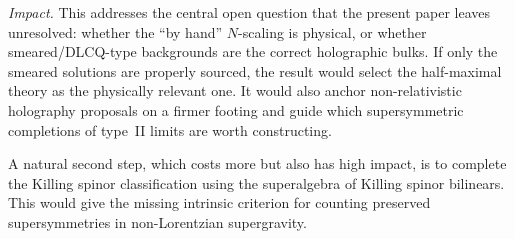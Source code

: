 \documentclass[11pt]{article}
\begin{document}
\emph{Impact.} This addresses the central open question that the present paper leaves unresolved: whether the ``by hand'' $N$-scaling is physical, or whether smeared/DLCQ-type backgrounds are the correct holographic bulks. If only the smeared solutions are properly sourced, the result would select the half-maximal theory as the physically relevant one. It would also anchor non-relativistic holography proposals on a firmer footing and guide which supersymmetric completions of type~II limits are worth constructing.

A natural second step, which costs more but also has high impact, is to complete the Killing spinor classification using the superalgebra of Killing spinor bilinears. This would give the missing intrinsic criterion for counting preserved supersymmetries in non-Lorentzian supergravity.
\end{document}
